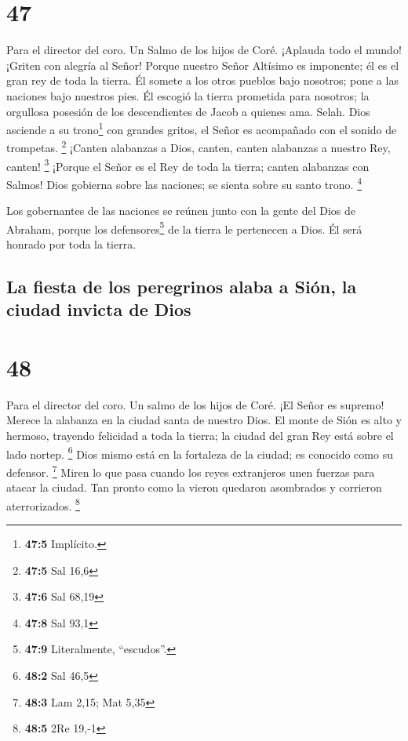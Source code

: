 \hypertarget{section-46}{%
\section{47}\label{section-46}}

Para el director del coro. Un Salmo de los hijos de Coré. 
¡Aplauda todo el mundo! ¡Griten con alegría al Señor! 
Porque nuestro Señor Altísimo es imponente; él es el gran rey de toda la
tierra.  Él somete a los otros pueblos bajo nosotros; pone
a las naciones bajo nuestros pies.  Él escogió la tierra
prometida para nosotros; la orgullosa posesión de los descendientes de
Jacob a quienes ama. Selah.  Dios asciende a su
trono\footnote{\textbf{47:5} Implícito.} con grandes gritos, el Señor es
acompañado con el sonido de trompetas. \footnote{\textbf{47:5} Sal 16,6}
 ¡Canten alabanzas a Dios, canten, canten alabanzas a
nuestro Rey, canten! \footnote{\textbf{47:6} Sal 68,19} 
¡Porque el Señor es el Rey de toda la tierra; canten alabanzas con
Salmos!  Dios gobierna sobre las naciones; se sienta sobre
su santo trono. \footnote{\textbf{47:8} Sal 93,1}

 Los gobernantes de las naciones se reúnen junto con la
gente del Dios de Abraham, porque los defensores\footnote{\textbf{47:9}
  Literalmente, ``escudos''.} de la tierra le pertenecen a Dios. Él será
honrado por toda la tierra.

\hypertarget{la-fiesta-de-los-peregrinos-alaba-a-siuxf3n-la-ciudad-invicta-de-dios}{%
\subsection{La fiesta de los peregrinos alaba a Sión, la ciudad invicta
de
Dios}\label{la-fiesta-de-los-peregrinos-alaba-a-siuxf3n-la-ciudad-invicta-de-dios}}

\hypertarget{section-47}{%
\section{48}\label{section-47}}

Para el director del coro. Un salmo de los hijos de Coré. 
¡El Señor es supremo! Merece la alabanza en la ciudad santa de nuestro
Dios.  El monte de Sión es alto y hermoso, trayendo
felicidad a toda la tierra; la ciudad del gran Rey está sobre el lado
nortep. \footnote{\textbf{48:2} Sal 46,5}  Dios mismo está
en la fortaleza de la ciudad; es conocido como su defensor. \footnote{\textbf{48:3}
  Lam 2,15; Mat 5,35}  Miren lo que pasa cuando los reyes
extranjeros unen fuerzas para atacar la ciudad.  Tan
pronto como la vieron quedaron asombrados y corrieron aterrorizados.
\footnote{\textbf{48:5} 2Re 19,-1}

